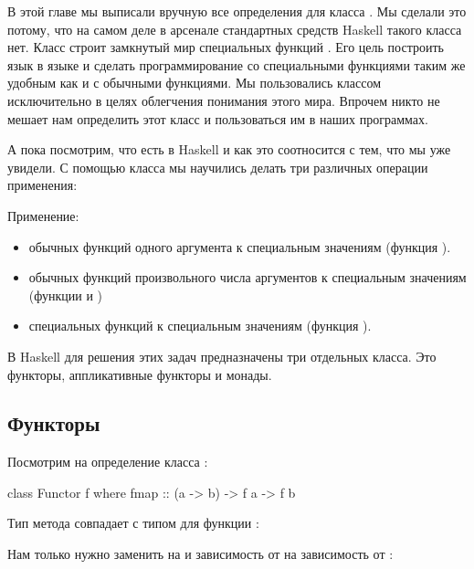 В этой главе мы выписали вручную все определения для
класса . Мы сделали это потому, что на самом
деле в арсенале стандартных средств Haskell такого 
класса нет. Класс  строит замкнутый 
мир специальных функций \mbox{}. Его цель построить язык 
в языке и сделать программирование со специальными функциями
таким же удобным как и с обычными функциями. 
Мы пользовались классом  исключительно в целях 
облегчения понимания этого мира. Впрочем никто не мешает
нам определить этот класс и пользоваться им в наших программах.

А пока посмотрим, что есть в Haskell и как это соотносится 
с тем, что мы уже увидели. С помощью класса   
мы научились делать три различных операции применения:

Применение:
\begin{itemize}
\item обычных функций одного аргумента к
        специальным значениям (функция \In{+$}). 

\item обычных функций произвольного числа аргументов к
        специальным значениям (функции \In{+$} и \In{$$})
        
\item специальных функций к специальным значениям
        (функция \In{*$}).

\end{itemize}

В Haskell для решения этих задач предназначены три отдельных
класса. Это функторы, аппликативные функторы и монады. 

\subsection{Функторы}

Посмотрим на определение класса  :

\begin{code}
class Functor f where
    fmap :: (a -> b) -> f a -> f b
\end{code}

Тип метода  совпадает с типом для функции \In{+$}:


Нам только нужно заменить  на  и 
зависимость от  на зависимость от :

